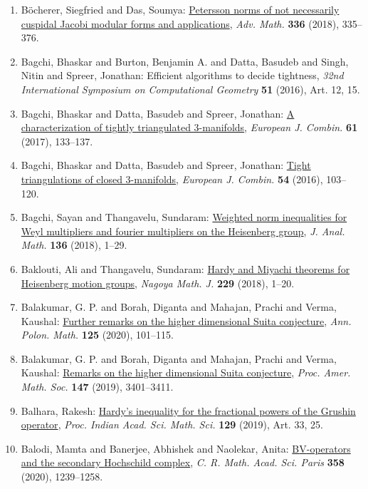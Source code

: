 \begin{enumerate}
{modular forms}, \emph{J. Reine Angew. Math.} {\bf 741} (2018), 161--178.
\item B\"{o}cherer, Siegfried and Das, Soumya: \href{https://doi.org/10.1016/j.aim.2018.07.033}{Petersson norms of not necessarily cuspidal {J}acobi modular
forms and applications}, \emph{Adv. Math.} {\bf 336} (2018), 335--376.
\item Bagchi, Bhaskar and Burton, Benjamin A. and Datta, Basudeb and
Singh, Nitin and Spreer, Jonathan: Efficient algorithms to decide tightness, \emph{32nd {I}nternational {S}ymposium on {C}omputational
{G}eometry} {\bf 51} (2016), Art. 12, 15.
\item Bagchi, Bhaskar and Datta, Basudeb and Spreer, Jonathan: \href{https://doi.org/10.1016/j.ejc.2016.10.005}{A characterization of tightly triangulated 3-manifolds}, \emph{European J. Combin.} {\bf 61} (2017), 133--137.
\item Bagchi, Bhaskar and Datta, Basudeb and Spreer, Jonathan: \href{https://doi.org/10.1016/j.ejc.2015.12.006}{Tight triangulations of closed 3-manifolds}, \emph{European J. Combin.} {\bf 54} (2016), 103--120.
\item Bagchi, Sayan and Thangavelu, Sundaram: \href{https://doi.org/10.1007/s11854-018-0053-8}{Weighted norm inequalities for {W}eyl multipliers and fourier
multipliers on the {H}eisenberg group}, \emph{J. Anal. Math.} {\bf 136} (2018), 1--29.
\item Baklouti, Ali and Thangavelu, Sundaram: \href{https://doi.org/10.1017/nmj.2016.58}{Hardy and {M}iyachi theorems for {H}eisenberg motion groups}, \emph{Nagoya Math. J.} {\bf 229} (2018), 1--20.
\item Balakumar, G. P. and Borah, Diganta and Mahajan, Prachi and
Verma, Kaushal: \href{https://doi.org/10.4064/ap200203-21-4}{Further remarks on the higher dimensional {S}uita conjecture}, \emph{Ann. Polon. Math.} {\bf 125} (2020), 101--115.
\item Balakumar, G. P. and Borah, Diganta and Mahajan, Prachi and
Verma, Kaushal: \href{https://doi.org/10.1090/proc/14421}{Remarks on the higher dimensional {S}uita conjecture}, \emph{Proc. Amer. Math. Soc.} {\bf 147} (2019), 3401--3411.
\item Balhara, Rakesh: \href{https://doi.org/10.1007/s12044-019-0471-2}{Hardy's inequality for the fractional powers of the {G}rushin
operator}, \emph{Proc. Indian Acad. Sci. Math. Sci.} {\bf 129} (2019), Art. 33, 25.
\item Balodi, Mamta and Banerjee, Abhishek and Naolekar, Anita: \href{https://doi.org/10.5802/crmath.157}{B{V}-operators and the secondary {H}ochschild complex}, \emph{C. R. Math. Acad. Sci. Paris} {\bf 358} (2020), 1239--1258.

\end{enumerate}
